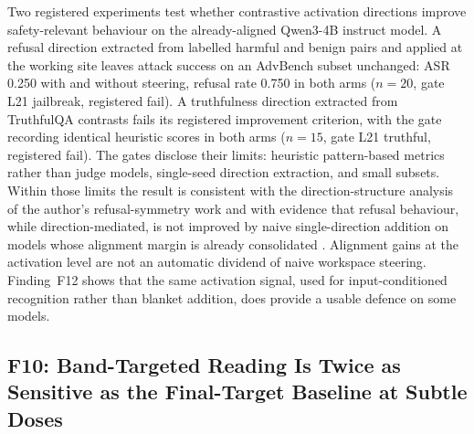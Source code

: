 Two registered experiments test whether contrastive activation directions \cite{Rimsky2024,Zou2023RepE} improve safety-relevant behaviour on the already-aligned Qwen3-4B instruct model. A refusal direction extracted from labelled harmful and benign pairs and applied at the working site leaves attack success on an AdvBench subset \cite{Zou2023AdvBench} unchanged: ASR 0.250 with and without steering, refusal rate 0.750 in both arms ($n=20$, gate L21 jailbreak, registered fail). A truthfulness direction extracted from TruthfulQA contrasts \cite{Lin2022} fails its registered improvement criterion, with the gate recording identical heuristic scores in both arms ($n=15$, gate L21 truthful, registered fail). The gates disclose their limits: heuristic pattern-based metrics rather than judge models, single-seed direction extraction, and small subsets. Within those limits the result is consistent with the direction-structure analysis of the author's refusal-symmetry work \cite{Sathish2026Refusal} and with evidence that refusal behaviour, while direction-mediated, is not improved by naive single-direction addition on models whose alignment margin is already consolidated \cite{Arditi2024}. Alignment gains at the activation level are not an automatic dividend of naive workspace steering. Finding~F12 shows that the same activation signal, used for input-conditioned recognition rather than blanket addition, does provide a usable defence on some models.

\subsection{F10: Band-Targeted Reading Is Twice as Sensitive as the Final-Target Baseline at Subtle Doses}
\label{sec:results:baseline}

